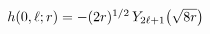 $\mathop{h\/}\nolimits\!\left(0,\ell;r\right)=-(2r)^{1/2}\mathop{Y_{2\ell+1}\/}%
\nolimits\!\left(\sqrt{8r}\right)$